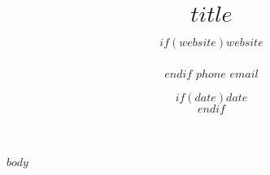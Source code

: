 \documentclass[11pt, letterpaper]{article}
\title{$title$} %
\date{$if(date)$$date$\\$endif$} %
\author{$if(website)$$website$\\\\$endif$
$phone$ \textbar{} $email$ } %
\begin{document}
\maketitle
\begin{raggedright}
$body$
\end{raggedright}
\end{document}
